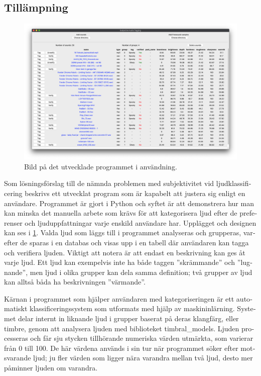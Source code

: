 \begin{otherlanguage}{swedish}
    \newpage\section*{Tillämpning}
    \begin{figure}[ht]
        \includegraphics[width=\textwidth]{figures/app/ui}
        \caption{Bild på det utvecklade programmet i användning.}\label{bild}
    \end{figure}

    Som lösningsförslag till de nämnda problemen med subjektivitet vid ljudklassificering beskrivs ett utvecklat program som är kapabelt att justera sig enligt en användare. Programmet är gjort i Python och syftet är att demonstrera hur man kan minska det manuella arbete som krävs för att kategorisera ljud efter de preferenser och ljuduppfattningar varje enskild användare har. Upplägget och designen kan ses i \cref{bild}. Valda ljud som läggs till i programmet analyseras och grupperas, varefter de sparas i en databas och visas upp i en tabell där användaren kan tagga och verifiera ljuden. Viktigt att notera är att endast en beskrivning kan ges åt varje ljud. Ett ljud kan exempelvis inte ha både taggen ”skrämmande” och ”lugnande”, men ljud i olika grupper kan dela samma definition; två grupper av ljud kan alltså båda ha beskrivningen ”värmande”.

    Kärnan i programmet som hjälper användaren med kategoriseringen är ett automatiskt klassificeringssystem som utformats med hjälp av maskininlärning. Systemet delar internt in liknande ljud i grupper baserat på deras klangfärg, eller timbre, genom att analysera ljuden med biblioteket timbral\_models. Ljuden processeras och får sju stycken tillhörande numeriska värden utmärkta, som varierar från 0 till 100. De här värdena används i sin tur när programmet söker efter motsvarande ljud; ju fler värden som ligger nära varandra mellan två ljud, desto mer påminner ljuden om varandra.


\end{otherlanguage}
